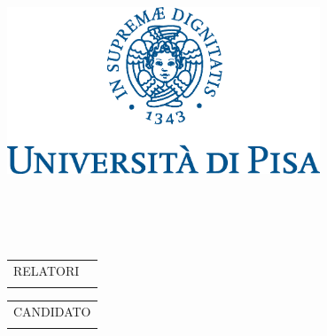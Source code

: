 \makeatletter
\begin{titlepage}
	\begin{center}
		\includegraphics[width=0.7\textwidth]{img/marchio_unipi_pant541}\\
		\vspace{0.15cm}
		\Large
		\printdepartment\\
		\vspace{0.7cm}
		\large
		\printcoursename\\
		\normalsize
		\vspace{2.5cm}
		\textit{\printworktype}\\
		\vspace{0.5cm}
		\large
		\textbf{\printtitle}\\
		\normalsize
		\vfill%
		\begin{minipage}[t]{0.7\textwidth}
			\begin{tabular}[t]{ll}%
				RELATORI&\vspace{0.2cm}\\
				\printsupervisor
			\end{tabular}\par%
		\end{minipage}
		\hfill
		\begin{minipage}[t]{0.28\textwidth}\raggedleft
			\begin{tabular}[t]{c}%
				CANDIDATO\vspace{0.2cm}\\
				\printauthor
			\end{tabular}\par%
		\end{minipage}
		\vfill
		\large
		\printacademicyear
		\normalsize
	\end{center}
\end{titlepage}
\makeatother
